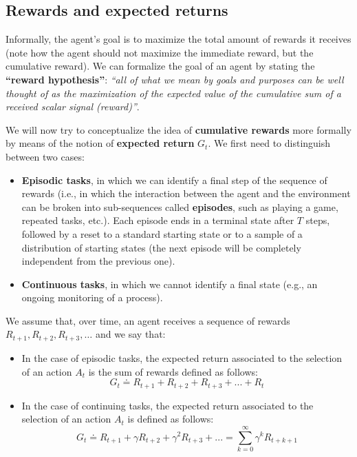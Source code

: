 \subsection{Rewards and expected returns}
Informally, the agent’s goal is to maximize the total amount of rewards it receives (note how the agent should not maximize the immediate reward, but the cumulative reward). We can formalize the goal of an agent by stating the \textbf{``reward hypothesis''}: \textit{``all of what we mean by goals and purposes can be well thought of as the maximization of the expected value of the cumulative sum of a received scalar signal (reward)''}.

We will now try to conceptualize the idea of \textbf{cumulative rewards} more formally by means of the notion of \textbf{expected return} $G_t$. We first need to distinguish between two cases:
\begin{itemize}
    \item \textbf{Episodic tasks}, in which we can identify a final step of the sequence of rewards (i.e., in which the interaction between the agent and the environment can be broken into sub-sequences called \textbf{episodes}, such as playing a game, repeated tasks, etc.). Each episode ends in a terminal state after $T$ steps, followed by a reset to a standard starting state or to a sample of a distribution of starting states (the next episode will be completely independent from the previous one).
    \item \textbf{Continuous tasks}, in which we cannot identify a final state (e.g., an ongoing monitoring of a process).
\end{itemize}

We assume that, over time, an agent receives a sequence of rewards $R_{t+1},R_{t+2},R_{t+3},…$ and we say that:
\begin{itemize}
    \item In the case of episodic tasks, the expected return associated to the selection of an action $A_t$ is the sum of rewards defined as follows:
    \begin{equation}
        G_t \doteq R_{t+1} + R_{t+2} + R_{t+3} + ... + R_t
        \label{eq:ch2-expectedreturn-episodic}
    \end{equation}
    \item In the case of continuing tasks, the expected return associated to the selection of an action $A_t$ is defined as follows:
    \begin{equation}
        G_t \doteq R_{t+1} + \gamma R_{t+2} + \gamma^2 R_{t+3} + ... = \sum_{k=0}^{\infty} \gamma^k R_{t+k+1}
        \label{eq:ch2-expectedreturn-continuous}
    \end{equation}
\end{itemize}

